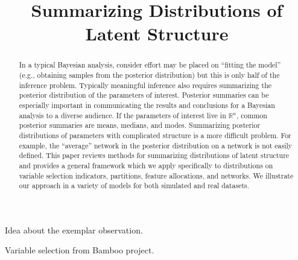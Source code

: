 \documentclass[sts]{imsart}
\begin{document}
\begin{frontmatter}

\title{Summarizing Distributions of Latent Structure}

\author{ \corref{}}
\address{}
\vspace{-1ex}

\author{ }
\address{}


\begin{abstract} In a typical Bayesian analysis, consider effort may be placed
on ``fitting the model'' (e.g., obtaining samples from the posterior
distribution) but this is only half of the inference problem.  Typically
meaningful inference also requires summarizing the posterior distribution of
the parameters of interest.  Posterior summaries can be especially important in
communicating the results and conclusions for a Bayesian analysis to a diverse
audience.  If the parameters of interest live in $\mathbb{R}^n$, common
posterior summaries are means, medians, and modes.  Summarizing posterior
distributions of parameters with complicated structure is a more difficult
problem.  For example, the ``average'' network in the posterior distribution on
a network is not easily defined.  This paper reviews methods for summarizing
distributions of latent structure and provides a general framework which we
apply specifically to distributions on variable selection indicators,
partitions, feature allocations, and networks.  We illustrate our approach in a
variety of models for both simulated and real datasets.  \end{abstract}


\begin{keyword}
\end{keyword}

\end{frontmatter}

Idea about the exemplar observation.

Variable selection from Bamboo project.
\end{document}
